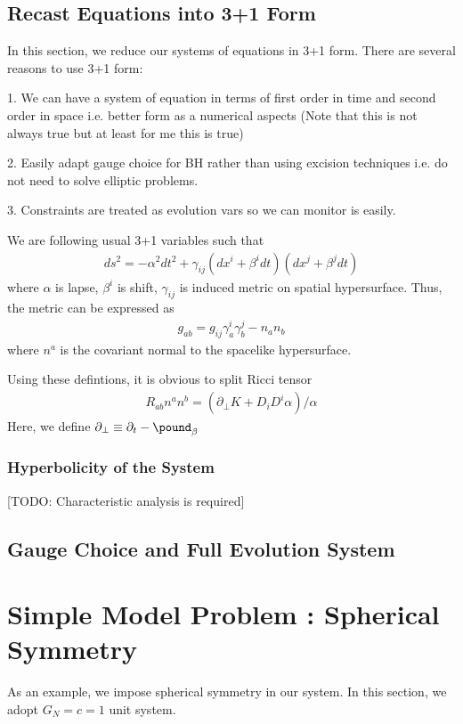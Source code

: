 \documentclass[a4paper,oneside,openany,11pt]{memoir}
\numberwithin{equation}{section} %
\newcommand{\TODO}[1]{{\color{red}[}{\color{red}TODO:} {\color{blue}#1}{\color{red}]}}
\begin{document}
\subsection{Recast Equations into 3+1 Form}

In this section, we reduce our systems of equations in 3+1 form. There are several reasons to use 3+1 form:

1. We can have a system of equation in terms of first order in time and second order in space i.e. better form
as a numerical aspects (Note that this is not always true but at least for me this is true)

2. Easily adapt gauge choice for BH rather than using excision techniques i.e. do not need to solve elliptic problems.

3. Constraints are treated as evolution vars so we can monitor is easily.

We are following usual 3+1 variables such that
\begin{align}
\label{eqn:3p1}
ds^2 = -\alpha^2 dt^2 + \gamma_{ij} (dx^i + \beta^i dt)(dx^j + \beta^j dt)
\end{align}
where $\alpha$ is lapse, $\beta^i$ is shift, $\gamma_{ij}$ is induced metric on spatial hypersurface.
Thus, the metric can be expressed as
\begin{align}
g_{ab} = g_{ij}\gamma^i_a \gamma^j_b - n_a n_b
\end{align}
where $n^a$ is the covariant normal to the spacelike hypersurface.

Using these defintions, it is obvious to split Ricci tensor
\begin{align}
\label{ricci3p1}
R_{ab} n^a n^b = (\partial_\bot K + D_i D^i \alpha)/\alpha
\end{align}
Here, we define $\partial_\bot \equiv \partial_t - \pound_\beta$


\subsubsection{Hyperbolicity of the System}
\TODO{Characteristic analysis is required}

\subsection{Gauge Choice and Full Evolution System}

\section{Simple Model Problem : Spherical Symmetry}
As an example, we impose spherical symmetry in our system. In this section, we adopt $G_N = c = 1$ unit system.
\end{document}
